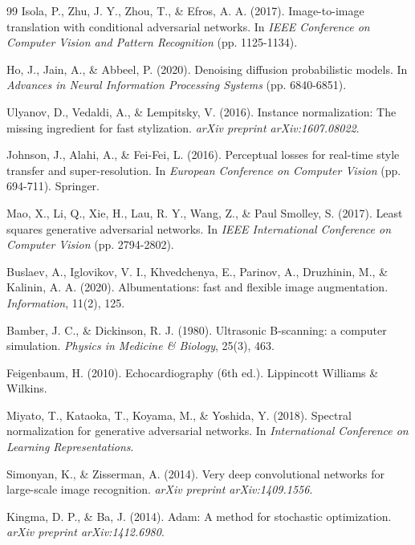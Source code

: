 \documentclass[10pt,conference,letterpaper]{IEEEtran}
\begin{document}
\begin{itemize}
\begin{thebibliography}{99}
Isola, P., Zhu, J. Y., Zhou, T., \& Efros, A. A. (2017).
\newblock Image-to-image translation with conditional adversarial networks.
\newblock In \textit{IEEE Conference on Computer Vision and Pattern Recognition} (pp. 1125-1134).

Ho, J., Jain, A., \& Abbeel, P. (2020).
\newblock Denoising diffusion probabilistic models.
\newblock In \textit{Advances in Neural Information Processing Systems} (pp. 6840-6851).

Ulyanov, D., Vedaldi, A., \& Lempitsky, V. (2016).
\newblock Instance normalization: The missing ingredient for fast stylization.
\newblock \textit{arXiv preprint arXiv:1607.08022}.

Johnson, J., Alahi, A., \& Fei-Fei, L. (2016).
\newblock Perceptual losses for real-time style transfer and super-resolution.
\newblock In \textit{European Conference on Computer Vision} (pp. 694-711). Springer.

Mao, X., Li, Q., Xie, H., Lau, R. Y., Wang, Z., \& Paul Smolley, S. (2017).
\newblock Least squares generative adversarial networks.
\newblock In \textit{IEEE International Conference on Computer Vision} (pp. 2794-2802).

Buslaev, A., Iglovikov, V. I., Khvedchenya, E., Parinov, A., Druzhinin, M., \& Kalinin, A. A. (2020).
\newblock Albumentations: fast and flexible image augmentation.
\newblock \textit{Information}, 11(2), 125.

Bamber, J. C., \& Dickinson, R. J. (1980).
\newblock Ultrasonic B-scanning: a computer simulation.
\newblock \textit{Physics in Medicine \& Biology}, 25(3), 463.

Feigenbaum, H. (2010).
\newblock Echocardiography (6th ed.).
\newblock Lippincott Williams \& Wilkins.

Miyato, T., Kataoka, T., Koyama, M., \& Yoshida, Y. (2018).
\newblock Spectral normalization for generative adversarial networks.
\newblock In \textit{International Conference on Learning Representations}.

Simonyan, K., \& Zisserman, A. (2014).
\newblock Very deep convolutional networks for large-scale image recognition.
\newblock \textit{arXiv preprint arXiv:1409.1556}.

Kingma, D. P., \& Ba, J. (2014).
\newblock Adam: A method for stochastic optimization.
\newblock \textit{arXiv preprint arXiv:1412.6980}.


\end{thebibliography}
\end{itemize}
\end{document}
